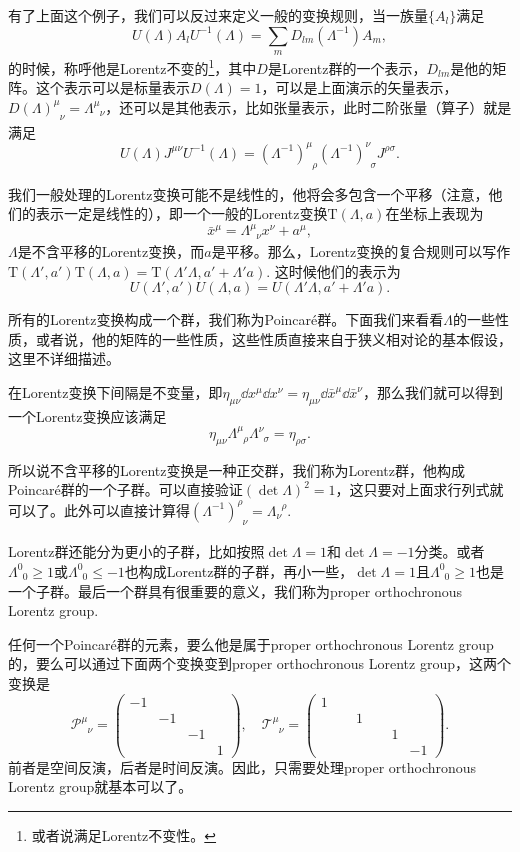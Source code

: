 有了上面这个例子，我们可以反过来定义一般的变换规则，当一族量$\{A_l\}$满足
\[
	U(\Lambda) A_l U^{-1}(\Lambda)=\sum_{m}D_{lm}(\Lambda^{-1})A_m,
\]
的时候，称呼他是Lorentz不变的\footnote{或者说满足Lorentz不变性。}，其中$D$是Lorentz群的一个表示，$D_{lm}$是他的矩阵。这个表示可以是标量表示$D(\Lambda)=1$，可以是上面演示的矢量表示，$D(\Lambda)^\mu_{\phantom{\mu}\nu}=\Lambda^\mu_{\phantom{\mu}\nu}$，还可以是其他表示，比如张量表示，此时二阶张量（算子）就是满足
\[
	U(\Lambda) J^{\mu \nu}U^{-1}(\Lambda)=(\Lambda^{-1})^\mu_{\phantom{\mu}\rho}(\Lambda^{-1})^\nu_{\phantom{\nu}\sigma}J^{\rho \sigma}.
\]

我们一般处理的Lorentz变换可能不是线性的，他将会多包含一个平移（注意，他们的表示一定是线性的），即一个一般的Lorentz变换$\mathrm{T}(\Lambda,a)$在坐标上表现为
\[
\bar{x}^\mu=\Lambda^\mu_{\phantom{\mu}\nu}x^\nu+a^\mu,
\]
$\Lambda$是不含平移的Lorentz变换，而$a$是平移。那么，Lorentz变换的复合规则可以写作
$\mathrm{T}(\Lambda',a')\mathrm{T}(\Lambda,a)=\mathrm{T}(\Lambda'\Lambda,a'+\Lambda'a)$.
这时候他们的表示为
\[U(\Lambda',a')U(\Lambda,a)=U(\Lambda'\Lambda,a'+\Lambda'a).\]

所有的Lorentz变换构成一个群，我们称为Poincar\'{e}群。下面我们来看看$\Lambda$的一些性质，或者说，他的矩阵的一些性质，这些性质直接来自于狭义相对论的基本假设，这里不详细描述。

在Lorentz变换下间隔是不变量，即$\eta_{\mu\nu}\dd x^\mu\dd x^\nu=\eta_{\mu\nu}\dd \bar{x}^\mu\dd \bar{x}^\nu$，那么我们就可以得到一个Lorentz变换应该满足
\[
\eta_{\mu\nu}\Lambda^\mu_{\phantom{\mu}\rho}\Lambda^\nu_{\phantom{\nu}\sigma}=\eta_{\rho\sigma}.
\]

所以说不含平移的Lorentz变换是一种正交群，我们称为Lorentz群，他构成Poincar\'{e}群的一个子群。可以直接验证$(\det \Lambda)^2=1$，这只要对上面求行列式就可以了。此外可以直接计算得$(\Lambda^{-1})^\rho_{\phantom{\rho}\nu}=\Lambda_\nu^{\phantom{\nu}\rho}$.

Lorentz群还能分为更小的子群，比如按照$\det \Lambda=1$和$\det \Lambda=-1$分类。或者$\Lambda^0_{\phantom{0}0}\geq 1$或$\Lambda^0_{\phantom{0}0}\leq -1$也构成Lorentz群的子群，再小一些，$\det \Lambda=1$且$\Lambda^0_{\phantom{0}0}\geq 1$也是一个子群。最后一个群具有很重要的意义，我们称为proper orthochronous Lorentz group.

任何一个Poincar\'{e}群的元素，要么他是属于proper orthochronous Lorentz group的，要么可以通过下面两个变换变到proper orthochronous Lorentz group，这两个变换是
\[
\mathscr{P}^\mu_{\phantom{\mu}\nu}=\begin{pmatrix}-1&&&\\&-1&&\\&&-1&\\&&&1 \end{pmatrix},\quad \mathscr{T}^\mu_{\phantom{\mu}\nu}=\begin{pmatrix}1&&&\\&\phantom{-}1&&\\&&\phantom{-}1&\\&&&-1 \end{pmatrix}.
\]
前者是空间反演，后者是时间反演。因此，只需要处理proper orthochronous Lorentz group就基本可以了。

